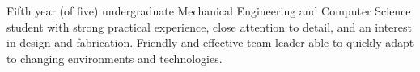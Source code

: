 
\begin{center}
	\begin{minipage}[t]{0.90\textwidth}
		Fifth year (of five) undergraduate Mechanical Engineering and Computer Science student with strong practical experience, close attention to detail, and an interest in design and fabrication. Friendly and effective team leader able to quickly adapt to changing environments and technologies.
	\end{minipage}
\end{center}